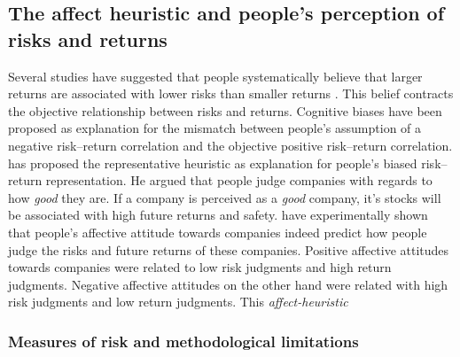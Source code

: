 \documentclass[a4paper,doc, natbib]{apa6} %
\begin{document}
\subsection{The affect heuristic and people's perception of risks and returns}
Several studies have suggested that people systematically believe that larger returns are associated with lower risks than smaller returns \citep[e.g.][]{Shefrin2001}. This belief contracts the objective relationship between risks and returns. Cognitive biases have been proposed as explanation for the mismatch between people's assumption of a negative risk--return correlation and the objective positive risk--return correlation. \cite{Shefrin2001} has proposed the representative heuristic as explanation for people's  biased risk--return representation. He argued that people judge companies with regards to how \textit{good} they are. If a company is perceived as a \textit{good} company, it's stocks will be associated with high future returns and safety. \cite{Kempf2014} have experimentally shown that people's affective attitude towards companies indeed predict how people judge the risks and future returns of these companies. Positive affective attitudes towards companies were related to low risk judgments and high return judgments. Negative affective attitudes on the other hand were related with high risk judgments and low return judgments. This \textit{affect-heuristic} 







\subsubsection{Measures of risk and methodological limitations}


\end{document}
